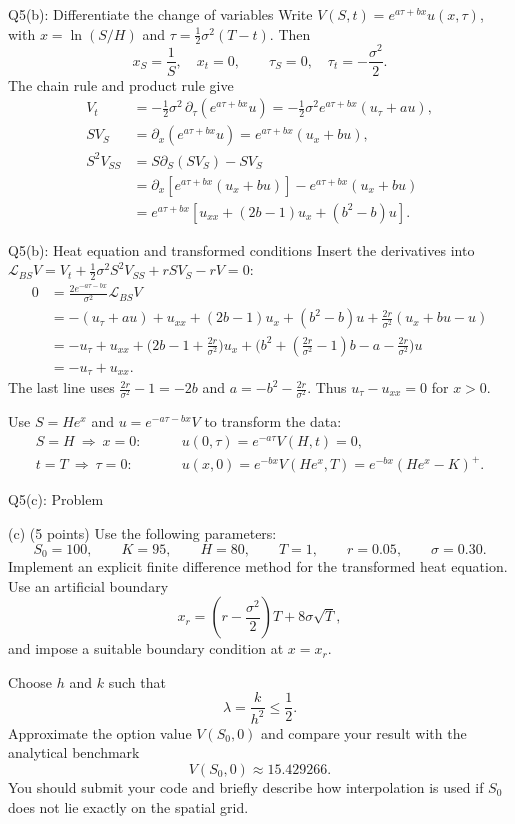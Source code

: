 \documentclass{beamer}
\newcommand{\keytext}[1]{\textcolor{lecturekey}{\textbf{#1}}}
\newcommand{\BS}{\mathcal L_{\!BS}}
\begin{document}
\begin{frame}{Q5(b): Differentiate the change of variables}
\small
Write $V(S,t)=e^{a\tau+bx}u(x,\tau)$, with
$x=\ln(S/H)$ and $\tau=\tfrac12\sigma^2(T-t)$. Then
\[
x_S=\frac1S,\quad x_t=0,\qquad
\tau_S=0,\quad \tau_t=-\frac{\sigma^2}{2}.
\]
The chain rule and product rule give
\begin{align*}
V_t
&=-\tfrac12\sigma^2\,\partial_\tau(e^{a\tau+bx}u)
 =-\tfrac12\sigma^2 e^{a\tau+bx}(u_\tau+au),\\
SV_S
&=\partial_x(e^{a\tau+bx}u)
 =e^{a\tau+bx}(u_x+bu),\\
S^2V_{SS}
&=S\partial_S(SV_S)-SV_S\\
&=\partial_x\!\left[e^{a\tau+bx}(u_x+bu)\right]-e^{a\tau+bx}(u_x+bu)\\
&=e^{a\tau+bx}\!\left[u_{xx}+(2b-1)u_x+(b^2-b)u\right].
\end{align*}
\end{frame}

\begin{frame}{Q5(b): Heat equation and transformed conditions}
\footnotesize
Insert the derivatives into $\BS V=V_t+\tfrac12\sigma^2S^2V_{SS}+rSV_S-rV=0$:
\begin{align*}
0&=\frac{2e^{-a\tau-bx}}{\sigma^2}\BS V\\
 &=-(u_\tau+au)+u_{xx}+(2b-1)u_x+(b^2-b)u
    +\tfrac{2r}{\sigma^2}(u_x+bu-u)\\
 &=-u_\tau+u_{xx}
    +\bigl(2b-1+\tfrac{2r}{\sigma^2}\bigr)u_x
    +\bigl(b^2+(\tfrac{2r}{\sigma^2}-1)b-a-\tfrac{2r}{\sigma^2}\bigr)u\\
 &=-u_\tau+u_{xx}.
\end{align*}
The last line uses $\tfrac{2r}{\sigma^2}-1=-2b$ and
$a=-b^2-\tfrac{2r}{\sigma^2}$. Thus \keytext{$u_\tau-u_{xx}=0$} for $x>0$.

\medskip
Use $S=He^x$ and $u=e^{-a\tau-bx}V$ to transform the data:
\begin{align*}
S=H\ \Rightarrow\ x=0:\qquad &u(0,\tau)=e^{-a\tau}V(H,t)=0,\\
t=T\ \Rightarrow\ \tau=0:\qquad &u(x,0)=e^{-bx}V(He^x,T)=e^{-bx}(He^x-K)^+.
\end{align*}
\end{frame}

\begin{frame}{Q5(c): Problem}
\footnotesize
\setlength{\abovedisplayskip}{5pt}
\setlength{\belowdisplayskip}{5pt}
\begin{block}{(c) \hfill (5 points)}
Use the following parameters:
\[
S_0=100,\qquad K=95,\qquad H=80,\qquad T=1,\qquad r=0.05,\qquad \sigma=0.30.
\]
Implement an explicit finite difference method for the transformed heat equation.
Use an artificial boundary
\[
x_r=\left(r-\frac{\sigma^2}{2}\right)T+8\sigma\sqrt{T},
\]
and impose a suitable boundary condition at $x=x_r$.

Choose $h$ and $k$ such that
\[
\lambda=\frac{k}{h^2}\leq\frac12.
\]
Approximate the option value $V(S_0,0)$ and compare your result with the analytical benchmark
\[
V(S_0,0)\approx 15.429266.
\]
You should submit your code and briefly describe how interpolation is used if
$S_0$ does not lie exactly on the spatial grid.
\end{block}
\end{frame}
\end{document}
